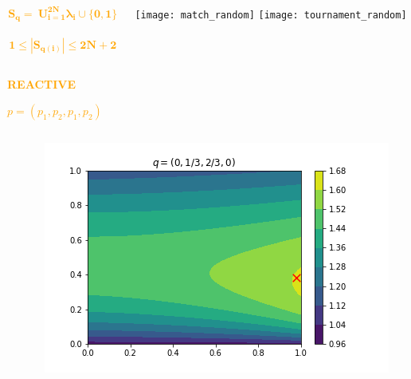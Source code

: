 \documentclass{beamer}
\begin{document}
\begin{frame}
    \begin{columns}
        \begin{column}{.5\textwidth}
    \Large{\textcolor{orange}{
    \[\mathbf{S_{q} = \displaystyle \ U_{i=1}^{2N}  \lambda_i \cup \{0, 1\}}\] \\
    \[\mathbf{1 \leq|S_{q(i)}| \leq 2N + 2}\]}}
        \end{column}
        \begin{column}{.5\textwidth}
            \texttt{[image: match\_random]}
            \texttt{[image: tournament\_random]}
        \end{column}
    \end{columns}
\end{frame}

\begin{frame}
    \begin{center}
    \Large{
    \textbf{\textcolor{orange}{REACTIVE}} \vspace{1cm}

    \textcolor{orange}{\boldmath\( p = (p_1, p_2, p_1, p_2)\)}}
    \end{center}
\end{frame}

\begin{frame}
    \begin{columns}
        \begin{column}{.5\textwidth}
            
        \end{column}
        \begin{column}{.5\textwidth}
            \includegraphics[width=\textwidth]{reactive}
        \end{column}
    \end{columns}
\end{frame}
\end{document}
